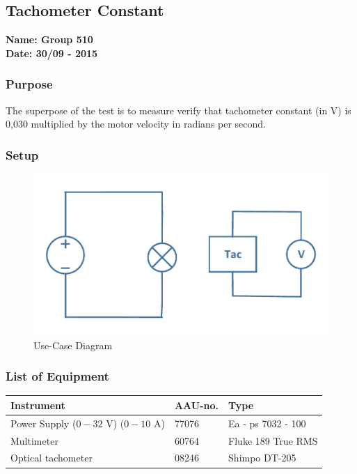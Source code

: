 \pagebreak
\subsection{Tachometer Constant} %
\textbf{Name: Group 510}\\
\textbf{Date: 30/09 - 2015}

\subsubsection{Purpose}
The superpose of the test is to measure verify that tachometer constant (in V) is 0,030 multiplied by the motor velocity in radians per second.

\subsubsection{Setup}
\begin{figure}[H]
  \centering
	\includegraphics[scale=0.5]{figures/MotorTest3.pdf}
	\caption{Use-Case Diagram}
	\flushleft
\end{figure}

\subsubsection{List of Equipment}

\begin{table}[H]
\begin{tabular}{|l|l|p{4cm}|}
\hline%
  \textbf{Instrument}                    &  \textbf{AAU-no.}  &  \textbf{Type}       \\
\hline%
  Power Supply ($0 - 32$ V) ($0 - 10$ A) &  77076             &  Ea - ps 7032 - 100  \\
\hline%
  Multimeter                             &  60764             &  Fluke 189 True RMS  \\
\hline%
  Optical tachometer                     &  08246             &  Shimpo DT-205       \\
\hline%
\end{tabular}
\end{table}

